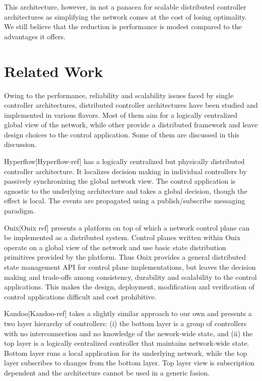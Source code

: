 \documentclass[10pt, twocolumn]{article}
\begin{document}
This architecture, however, in not a panacea for scalable distributed controller architectures as simplifying the network comes at the cost of losing optimality. We still believe that the reduction is performance is modest compared to the advantages it offers.

\section{Related Work}
\label{sec:related}
Owing to the performance, reliability and scalability issues faced by single controller architectures, distributed controller architectures have been studied and implemented in various flavors. Most of them aim for a logically centralized global view of the network, while other provide a distributed framework and leave design choices to the control application. Some of them are discussed in this discussion.

Hyperflow[Hyperflow-ref] has a logically centralized but physically distributed controller architecture. It localizes decision making in individual controllers by passively synchronizing the global network view. The control application is agnostic to the underlying architecture and takes a global decision, though the effect is local. The events are propagated using a publish/subscribe messaging paradigm.

Onix[Onix ref] presents a platform on top of which a network control plane can be implemented as a distributed system. Control planes written within Onix operate on a global view of the network and use basic state distribution primitives provided by the platform. Thus Onix provides a general distributed state management API for control plane implementations, but leaves the decision making and trade-offs among consistency, durability and scalability to the control applications. This makes the design, deployment, modification and verification of control applications difficult and cost prohibitive.

Kandoo[Kandoo-ref] takes a slightly similar approach to our own and presents a two layer hierarchy of controllers: (i) the bottom layer is a group of controllers with no interconnection and no knowledge of the nework-wide state, and (ii) the top layer is a logically centralized controller that maintains network-wide state. Bottom layer runs a local application for its underlying network, while the top layer subscribes to changes from the bottom layer. Top layer view is subscription dependent and the architecture cannot be used in a generic fasion.
\end{document}
